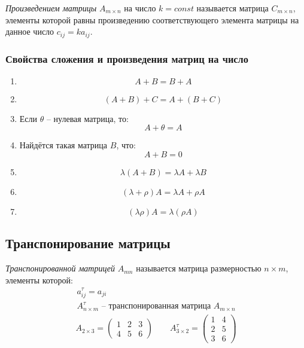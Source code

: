 \begin{definition}
  \textit{Произведением матрицы} $A_{m \times n}$ на число $k = const$ называется матрица $C_{m \times n}$, элементы которой равны произведению соответствующего элемента матрицы на данное число $c_{ij} = k a_{ij}$.
\end{definition}

\subsubsection{Свойства сложения и произведения матриц на число}

\begin{enumerate}
  \item \[
    A + B = B + A
  \] 

  \item \[
   (A + B) + C = A + (B + C)
  \]

  \item Если $\theta$ -- нулевая матрица, то: \[
    A + \theta = A
  \] 

  \item Найдётся такая матрица $B$, что:  \[
    A + B = 0
  \]  

  \item \[
  \lambda (A + B) = \lambda A + \lambda B
  \] 

  \item \[
      (\lambda + \rho) A = \lambda A + \rho A
  \] 

 \item \[
    (\lambda \rho) A = \lambda (\rho A)
 \] 
\end{enumerate}

\subsection{Транспонирование матрицы}

\begin{definition}
  \textit{Транспонированной матрицей} $A_{mn}$ называется матрица размерностью $n \times  m$, элементы которой:
  \begin{gather*}
    a^\tau_{ij} = a_{ji} \\
    A_{n \times m}^\tau \text{ -- транспонированная матрица } A_{m \times n}
  \end{gather*}
  \begin{gather*}
    A_{2 \times 3} = 
    \begin{pmatrix}
      1 & 2 & 3 \\
      4 & 5 & 6
    \end{pmatrix} \qquad
    A^\tau_{3 \times 2} = 
    \begin{pmatrix}
      1 & 4 \\
      2 & 5 \\
      3 & 6
    \end{pmatrix}
  \end{gather*}
\end{definition}

